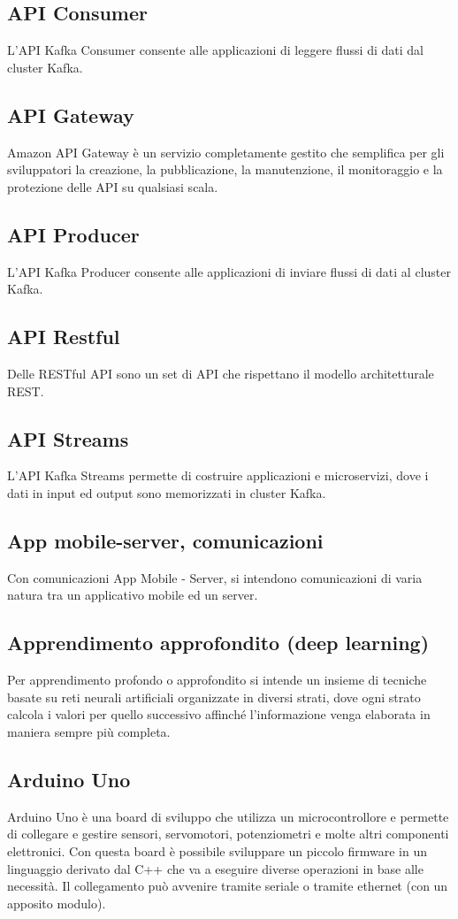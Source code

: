 \subsection{API Consumer}  L'API Kafka Consumer consente alle applicazioni di leggere flussi di dati dal cluster Kafka.
\subsection{API Gateway}  Amazon API Gateway è un servizio completamente gestito che semplifica per gli sviluppatori la creazione, la pubblicazione, la manutenzione, il monitoraggio e la protezione delle API su qualsiasi scala.
\subsection{API Producer}  L'API Kafka Producer consente alle applicazioni di inviare flussi di dati al cluster Kafka.
\subsection{API Restful}  Delle RESTful API sono un set di API che rispettano il modello architetturale REST.
\subsection{API Streams}  L'API Kafka Streams permette di costruire applicazioni e microservizi, dove i dati in input ed output sono memorizzati in cluster Kafka.
\subsection{App mobile-server, comunicazioni}  Con comunicazioni App Mobile - Server, si intendono comunicazioni di varia natura tra un applicativo mobile ed un server.
\subsection{Apprendimento approfondito (deep learning)}  Per apprendimento profondo o approfondito si intende un insieme di tecniche basate su reti neurali artificiali organizzate in diversi strati, dove ogni strato calcola i valori per quello successivo affinché l'informazione venga elaborata in maniera sempre più completa.
\subsection{Arduino Uno}  Arduino Uno è una board di sviluppo che utilizza un microcontrollore e permette di collegare e gestire sensori, servomotori, potenziometri e molte altri componenti elettronici. Con questa board è possibile sviluppare un piccolo firmware in un linguaggio derivato dal C++ che va a eseguire diverse operazioni in base alle necessità. Il collegamento può avvenire tramite seriale o tramite ethernet (con un apposito modulo).
